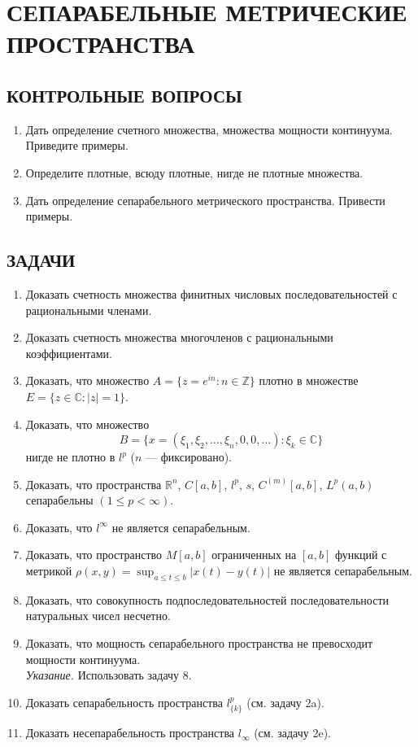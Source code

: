 \documentclass[12pt,a4paper]{article}
\begin{document}
\section{СЕПАРАБЕЛЬНЫЕ МЕТРИЧЕСКИЕ ПРОСТРАНСТВА}

\subsection*{КОНТРОЛЬНЫЕ ВОПРОСЫ}
\begin{enumerate}
\item Дать определение счетного множества, множества мощности континуума. Приведите примеры.
\item Определите плотные, всюду плотные, нигде не плотные множества.
\item Дать определение сепарабельного метрического пространства. Привести примеры.
\end{enumerate}

\subsection*{ЗАДАЧИ}
\begin{enumerate}
\item Доказать счетность множества финитных числовых последовательностей с рациональными членами.

\item Доказать счетность множества многочленов с рациональными коэффициентами.

\item Доказать, что множество $A=\{z=e^{in} : n\in\mathbb{Z}\}$ плотно в множестве $E=\{z\in\mathbb{C} : |z|=1\}$.

\item Доказать, что множество
$$B=\{x=(\xi_{1},\xi_{2},\dots,\xi_{n},0,0,\dots) : \xi_{k}\in\mathbb{C}\}$$
нигде не плотно в $l^{p}$ ($n$ — фиксировано).

\item Доказать, что пространства $\mathbb{R}^{n}$, $C[a,b]$, $l^{p}$, $s$, $C^{(m)}[a,b]$, $L^{p}(a,b)$ сепарабельны $(1\le p<\infty)$.

\item Доказать, что $l^{\infty}$ не является сепарабельным.

\item Доказать, что пространство $M[a,b]$ ограниченных на $[a, b]$ функций с метрикой $\rho(x,y)=\sup_{a\le t\le b}|x(t)-y(t)|$ не является сепарабельным.

\item Доказать, что совокупность подпоследовательностей последовательности натуральных чисел несчетно.

\item Доказать, что мощность сепарабельного пространства не превосходит мощности континуума.\\
\textit{Указание.} Использовать задачу 8.

\item Доказать сепарабельность пространства $l_{\{k\}}^{p}$ (см. задачу 2a).

\item Доказать несепарабельность пространства $l_{\infty}$ (см. задачу 2e).
\end{enumerate}
\end{document}
